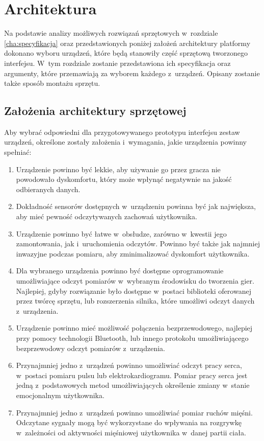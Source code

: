 \chapter{Architektura}
\label{cha:architektura}
Na podstawie analizy możliwych rozwiązań sprzętowych w~rozdziale \ref{cha:specyfikacja} oraz przedstawionych poniżej założeń architektury platformy dokonano wyboru urządzeń, które będą stanowiły część sprzętową tworzonego interfejsu. W~tym rozdziale zostanie przedstawiona ich specyfikacja oraz argumenty, które przemawiają za wyborem każdego z~urządzeń. Opisany zostanie także sposób montażu sprzętu.

\section{Założenia architektury sprzętowej}
Aby wybrać odpowiedni dla przygotowywanego prototypu interfejsu zestaw urządzeń, określone zostały założenia i~wymagania, jakie urządzenia powinny spełniać:
\begin{enumerate}
\item Urządzenie powinno być lekkie, aby używanie go przez gracza nie powodowało dyskomfortu, który może wpłynąć negatywnie na jakość odbieranych danych.
\item Dokładność sensorów dostępnych w~urządzeniu powinna być jak największa, aby mieć pewność odczytywanych zachowań użytkownika.
\item Urządzenie powinno być łatwe w~obsłudze, zarówno w~kwestii jego zamontowania, jak i~uruchomienia odczytów. Powinno być także jak najmniej inwazyjne podczas pomiaru, aby zminimalizować dyskomfort użytkownika.
\item Dla wybranego urządzenia powinno być dostępne oprogramowanie umożliwiające odczyt pomiarów w~wybranym środowisku do tworzenia gier. Najlepiej, gdyby rozwiązanie było dostępne w~postaci biblioteki oferowanej przez twórcę sprzętu, lub rozszerzenia silnika, które umożliwi odczyt danych z~urządzenia.
\item Urządzenie powinno mieć możliwość połączenia bezprzewodowego, najlepiej przy pomocy technologii Bluetooth, lub innego protokołu umożliwiającego bezprzewodowy odczyt pomiarów z~urządzenia.
\item Przynajmniej jedno z~urządzeń powinno umożliwiać odczyt pracy serca, w~postaci pomiaru pulsu lub elektrokardiogramu. Pomiar pracy serca jest jedną z~podstawowych metod umożliwiających określenie zmiany w~stanie emocjonalnym użytkownika.
\item Przynajmniej jedno z~urządzeń powinno umożliwiać pomiar ruchów mięśni. Odczytane sygnały mogą być wykorzystane do wpływania na rozgrywkę w~zależności od aktywności mięśniowej użytkownika w~danej partii ciała.
\end{enumerate}


